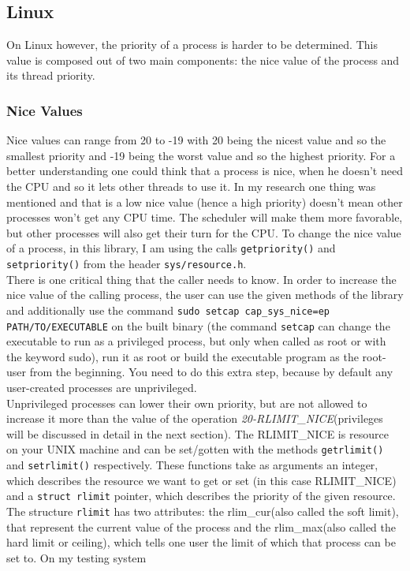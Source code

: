 \subsection{Linux}
On Linux however, the priority of a process is harder to be determined. This value is composed out of two main components: the nice value of the process and its thread priority.
\subsubsection{Nice Values}
Nice values can range from 20 to
-19 with 20 being the nicest value and so the smallest priority and -19 being the worst value and so
the highest priority. For a better understanding one could think that a process is nice, when he doesn't need
the CPU and so it lets other threads to use it. In my research one thing was mentioned and that is a low nice value (hence a high priority) doesn't mean other processes won't get any CPU
time. The scheduler will make them more favorable, but other processes will also get their turn for the
CPU.
To change the nice value of a process, in this library, I am using
the calls \texttt{getpriority()} and \texttt{setpriority()} from the header \texttt{sys/resource.h}.\\
There is one
critical thing that the caller needs to know. In order to increase the nice value of the calling
process, the user can use the given methods of the library and additionally use the command
\texttt{sudo setcap cap\_sys\_nice=ep PATH/TO/EXECUTABLE} on the built binary (the command \texttt{setcap} can change the executable to
run as a privileged process, but only when called as root or with the keyword \dq sudo\dq{}), run it as root or build the executable
program as the root-user from the beginning. You need to do this extra step,
because by default any user-created processes are unprivileged.\\
Unprivileged processes can lower their own
priority, but are not allowed to increase it more than the value of the operation
\textit{20-RLIMIT\_NICE}(privileges will be discussed in detail in the next section). The RLIMIT\_NICE is resource on your UNIX machine and can be set/gotten with the methods \texttt{getrlimit()} and \texttt{setrlimit()} respectively. These functions take as arguments an integer, which describes the resource we want to get or set (in this case RLIMIT\_NICE) and a \texttt{struct rlimit} pointer, which describes the priority of the given resource. The structure \texttt{rlimit} has two attributes: the \dq rlim\_cur\dq{}(also called the soft limit), that represent the current value of the process and the \dq rlim\_max\dq{}(also called the hard limit or ceiling), which tells one user the limit of which that process can be set to. On my testing system
